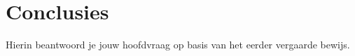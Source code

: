 \section{Conclusies}
\label{sec:conc}

Hierin beantwoord je jouw hoofdvraag op basis van het eerder vergaarde bewijs.




